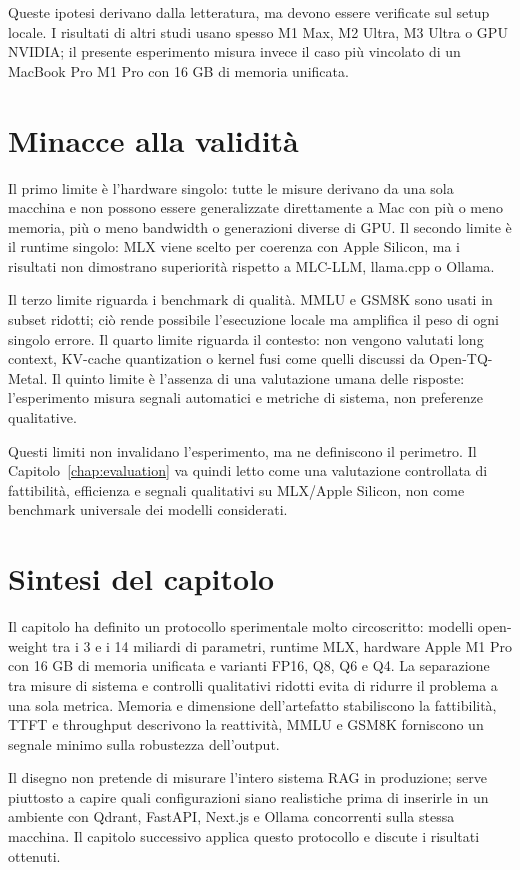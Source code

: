 Queste ipotesi derivano dalla letteratura, ma devono essere verificate sul
setup locale. I risultati di altri studi usano spesso M1 Max, M2 Ultra, M3
Ultra o GPU NVIDIA; il presente esperimento misura invece il caso più vincolato
di un MacBook Pro M1 Pro con 16 GB di memoria unificata.

\section{Minacce alla validità}
\label{sec:experimental_validity}

Il primo limite è l'hardware singolo: tutte le misure derivano da una sola
macchina e non possono essere generalizzate direttamente a Mac con più o meno memoria,
più o meno bandwidth o generazioni diverse di GPU. Il secondo limite è il runtime
singolo: MLX viene scelto per coerenza con Apple Silicon, ma i risultati non
dimostrano superiorità rispetto a MLC-LLM, llama.cpp o Ollama.

Il terzo limite riguarda i benchmark di qualità. MMLU e GSM8K sono usati in
subset ridotti; ciò rende possibile l'esecuzione locale ma amplifica il peso
di ogni singolo errore. Il quarto limite riguarda il contesto: non vengono
valutati long context, KV-cache quantization o kernel fusi come quelli discussi
da Open-TQ-Metal. Il quinto limite è l'assenza di una valutazione umana delle
risposte: l'esperimento misura segnali automatici e metriche di sistema, non
preferenze qualitative.

Questi limiti non invalidano l'esperimento, ma ne definiscono il perimetro. Il
Capitolo~\ref{chap:evaluation} va quindi letto come una valutazione controllata
di fattibilità, efficienza e segnali qualitativi su MLX/Apple Silicon, non
come benchmark universale dei modelli considerati.

\section{Sintesi del capitolo}
\label{sec:experimental_summary}

Il capitolo ha definito un protocollo sperimentale molto circoscritto: modelli
open-weight tra i 3 e i 14 miliardi di parametri, runtime MLX, hardware Apple M1 Pro con
16 GB di memoria unificata e varianti FP16, Q8, Q6 e Q4. La
separazione tra misure di sistema e controlli qualitativi ridotti evita di
ridurre il problema a una sola metrica. Memoria e dimensione dell'artefatto
stabiliscono la fattibilità, TTFT e throughput descrivono la reattività, MMLU e
GSM8K forniscono un segnale minimo sulla robustezza dell'output.

Il disegno non pretende di misurare l'intero sistema RAG in produzione; serve
piuttosto a capire quali configurazioni siano realistiche prima di inserirle in
un ambiente con Qdrant, FastAPI, Next.js e Ollama concorrenti sulla stessa
macchina. Il capitolo successivo applica questo protocollo e discute i
risultati ottenuti.

